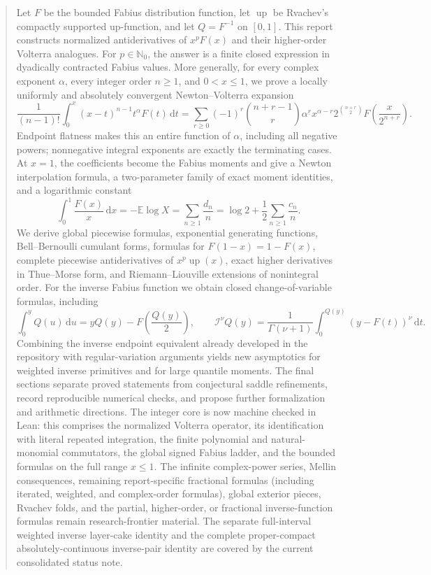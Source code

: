 \documentclass[11pt,oneside]{article}
\theoremstyle{definition}
\theoremstyle{remark}
\newcommand{\Up}{\operatorname{up}}
\newcommand{\E}{\mathbb E}
\newcommand{\N}{\mathbb N}
\newcommand{\dd}{\,\mathrm d}
\newcommand{\fall}[2]{#1^{\underline{#2}}}
\newcommand{\RL}{\mathcal I}
\newcommand{\1}{\mathbf 1}
\begin{document}
\begin{abstract}
Let \(F\) be the bounded Fabius distribution function, let \(\Up\) be Rvachev's
compactly supported up-function, and let \(Q=F^{-1}\) on \([0,1]\).  This report
constructs normalized antiderivatives of \(x^pF(x)\) and their higher-order
Volterra analogues.  For \(p\in\N_0\), the answer is a finite closed expression
in dyadically contracted Fabius values.  More generally, for every complex
exponent \(\alpha\), every integer order \(n\geq1\), and \(0<x\leq1\), we prove
a locally uniformly and absolutely convergent Newton--Volterra expansion
\[
 \frac1{(n-1)!}\int_0^x(x-t)^{n-1}t^\alpha F(t)\dd t
 =\sum_{r\geq0}(-1)^r\binom{n+r-1}{r}\fall{\alpha}{r}
 x^{\alpha-r}2^{\binom{n+r}{2}}F\!\left(\frac{x}{2^{n+r}}\right).
\]
Endpoint flatness makes this an entire function of \(\alpha\), including all
negative powers; nonnegative integral exponents are exactly the terminating
cases.  At \(x=1\), the coefficients become the Fabius moments and give a
Newton interpolation formula, a two-parameter family of exact moment
identities, and a logarithmic constant
\[
 \int_0^1\frac{F(x)}x\dd x
 =-\E\log X
 =\sum_{n\geq1}\frac{d_n}{n}
 =\log2+\frac12\sum_{n\geq1}\frac{c_n}{n}.
\]
We derive global piecewise formulas, exponential generating functions,
Bell--Bernoulli cumulant forms, formulas for \(F(1-x)=1-F(x)\), complete
piecewise antiderivatives of \(x^p\Up(x)\), exact higher derivatives in
Thue--Morse form, and Riemann--Liouville extensions of nonintegral order.
For the inverse Fabius function we obtain closed change-of-variable formulas,
including
\[
 \int_0^yQ(u)\dd u=yQ(y)-F\!\left(\frac{Q(y)}2\right),\qquad
 \RL^\nu Q(y)=\frac1{\Gamma(\nu+1)}
 \int_0^{Q(y)}(y-F(t))^\nu\dd t.
\]
Combining the inverse endpoint equivalent already developed in the repository
with regular-variation arguments yields new asymptotics for weighted inverse
primitives and for large quantile moments.  The final sections separate proved
statements from conjectural saddle refinements, record reproducible numerical
checks, and propose further formalization and arithmetic directions.  The
integer core is now machine checked in Lean: this comprises the normalized
Volterra operator, its identification with literal repeated integration, the
finite polynomial and natural-monomial commutators, the global signed Fabius
ladder, and the bounded formulas on the full range \(x\leq1\).  The infinite
complex-power series, Mellin consequences, remaining report-specific fractional formulas
(including iterated, weighted, and complex-order formulas), global exterior pieces,
Rvachev folds, and the partial, higher-order, or fractional inverse-function formulas
remain research-frontier material.  The separate
full-interval weighted inverse layer-cake identity and the complete proper-compact
absolutely-continuous inverse-pair identity are covered by the current consolidated
status note.
\end{abstract}
\end{document}
